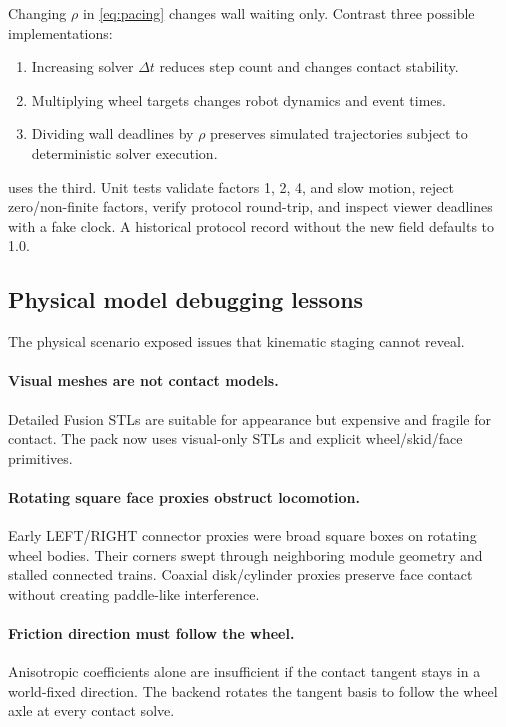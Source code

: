 Changing $\rho$ in \cref{eq:pacing} changes wall waiting only. Contrast three possible
implementations:

\begin{enumerate}
  \item Increasing solver $\Delta t$ reduces step count and changes contact stability.
  \item Multiplying wheel targets changes robot dynamics and event times.
  \item Dividing wall deadlines by $\rho$ preserves simulated trajectories subject to
        deterministic solver execution.
\end{enumerate}

\modsim{} uses the third. Unit tests validate factors 1, 2, 4, and slow motion, reject
zero/non-finite factors, verify protocol round-trip, and inspect viewer deadlines with a
fake clock. A historical protocol record without the new field defaults to 1.0.

\subsection{Physical model debugging lessons}

The physical scenario exposed issues that kinematic staging cannot reveal.

\paragraph{Visual meshes are not contact models.}
Detailed Fusion STLs are suitable for appearance but expensive and fragile for contact.
The pack now uses visual-only STLs and explicit wheel/skid/face primitives.

\paragraph{Rotating square face proxies obstruct locomotion.}
Early LEFT/RIGHT connector proxies were broad square boxes on rotating wheel bodies.
Their corners swept through neighboring module geometry and stalled connected trains.
Coaxial disk/cylinder proxies preserve face contact without creating paddle-like
interference.

\paragraph{Friction direction must follow the wheel.}
Anisotropic coefficients alone are insufficient if the contact tangent stays in a
world-fixed direction. The backend rotates the tangent basis to follow the wheel axle
at every contact solve.

